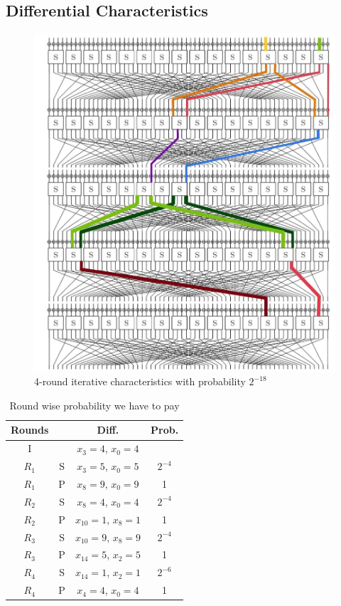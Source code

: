 \documentclass[journal=tosc,preprint]{iacrtrans}
\begin{document}
\subsection{Differential Characteristics}
\begin{figure}[h!]
	\centering
	\includegraphics[width=0.72\linewidth, height=0.65\textheight]{IMG_20211114_110332}
	\caption{4-round iterative characteristics with probability $2^{-18}$}
	\label{fig:img20211114110332}
\end{figure}
\newpage
\begin{table}[h!]
	\caption{Round wise probability we have to pay}
	\centering
	\begin{tabular}{ |c||c|c|c| }
		\hline
		Rounds & & Diff. & Prob. \\ \hline \hline
		I& & $x_3 = 4$, $x_0 = 4$ &  \\ 
		$R_1$& S & $x_3 = 5$, $x_{0} = 5$ & $2^{-4}$ \\
		$R_1$& P & $x_8 = 9$, $x_{0} = 9$ & 1 \\
		$R_2$& S & $x_8 = 4$, $x_{0} = 4$ & $2^{-4}$ \\
		$R_2$& P & $x_{10} = 1$, $x_{8} = 1$ & 1 \\
		$R_3$& S & $x_{10} = 9$, $x_{8} = 9$ & $2^{-4}$ \\
		$R_3$& P & $x_{14} = 5$, $x_{2} = 5$ & 1 \\
		$R_4$& S & $x_{14} = 1$, $x_{2} = 1$  & $2^{-6}$ \\
		$R_4$& P & $x_4 = 4$, $x_0 = 4$ & 1 \\ \hline
	\end{tabular}\\
\end{table}
\end{document}
